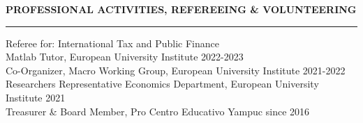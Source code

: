 \documentclass[letterpaper,11pt]{article}
\begin{document}
\vspace{0.5cm}
\textbf{PROFESSIONAL ACTIVITIES, REFEREEING \& VOLUNTEERING}\\
\vspace{1mm} \hrule
\vspace{0.2cm}
\hspace{1.3cm} Referee for: International Tax and Public Finance\\
\vspace{0.1cm}
\hspace{1.3cm} Matlab Tutor, European University Institute \hfill 2022-2023\\
\vspace{0.1cm}
\hspace{1.3cm} Co-Organizer, Macro Working Group, European University Institute \hfill 2021-2022\\
\vspace{0.1cm}
\hspace{1.3cm} Researchers Representative Economics Department, European University Institute \hfill 2021\\ \vspace{0.1cm}
\hspace{1.3cm} Treasurer \& Board Member, Pro Centro Educativo Yampuc \hfill since 2016\\
\vspace{0.1cm}

%
\end{document}
